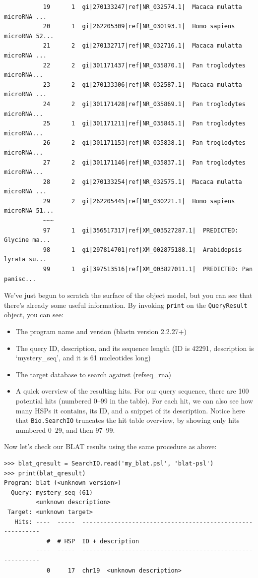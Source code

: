 \documentclass{report}
\begin{document}
\begin{verbatim}
           19      1  gi|270133247|ref|NR_032574.1|  Macaca mulatta microRNA ...
           20      1  gi|262205309|ref|NR_030193.1|  Homo sapiens microRNA 52...
           21      2  gi|270132717|ref|NR_032716.1|  Macaca mulatta microRNA ...
           22      2  gi|301171437|ref|NR_035870.1|  Pan troglodytes microRNA...
           23      2  gi|270133306|ref|NR_032587.1|  Macaca mulatta microRNA ...
           24      2  gi|301171428|ref|NR_035869.1|  Pan troglodytes microRNA...
           25      1  gi|301171211|ref|NR_035845.1|  Pan troglodytes microRNA...
           26      2  gi|301171153|ref|NR_035838.1|  Pan troglodytes microRNA...
           27      2  gi|301171146|ref|NR_035837.1|  Pan troglodytes microRNA...
           28      2  gi|270133254|ref|NR_032575.1|  Macaca mulatta microRNA ...
           29      2  gi|262205445|ref|NR_030221.1|  Homo sapiens microRNA 51...
           ~~~
           97      1  gi|356517317|ref|XM_003527287.1|  PREDICTED: Glycine ma...
           98      1  gi|297814701|ref|XM_002875188.1|  Arabidopsis lyrata su...
           99      1  gi|397513516|ref|XM_003827011.1|  PREDICTED: Pan panisc...
\end{verbatim}

We've just begun to scratch the surface of the object model, but you can see that
there's already some useful information. By invoking \verb|print| on the
\verb|QueryResult| object, you can see:

\begin{itemize}
\item The program name and version (blastn version 2.2.27+)
\item The query ID, description, and its sequence length (ID is 42291,
    description is `mystery\_seq', and it is 61 nucleotides long)
\item The target database to search against (refseq\_rna)
\item A quick overview of the resulting hits. For our query sequence, there are
    100 potential hits (numbered 0--99 in the table). For each hit, we can also see
    how many HSPs it contains, its ID, and a snippet of its description. Notice
    here that \verb|Bio.SearchIO| truncates the hit table overview, by showing
    only hits numbered 0--29, and then 97--99.
\end{itemize}

Now let's check our BLAT results using the same procedure as above:

\begin{verbatim}
>>> blat_qresult = SearchIO.read('my_blat.psl', 'blat-psl')
>>> print(blat_qresult)
Program: blat (<unknown version>)
  Query: mystery_seq (61)
         <unknown description>
 Target: <unknown target>
   Hits: ----  -----  ----------------------------------------------------------
            #  # HSP  ID + description                                          
         ----  -----  ----------------------------------------------------------
            0     17  chr19  <unknown description>                              
\end{verbatim}
\end{document}

